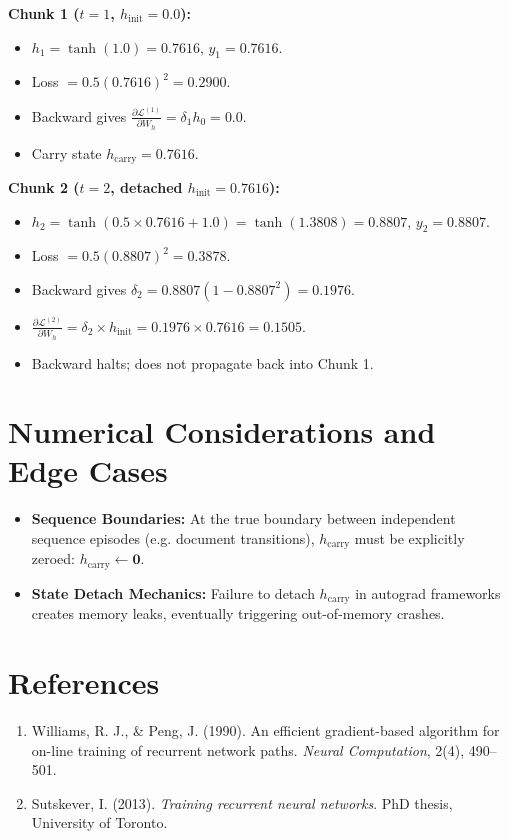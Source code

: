\documentclass[11pt,a4paper]{article}
\theoremstyle{definition}
\begin{document}
\textbf{Chunk 1 ($t=1$, $h_{\text{init}}=0.0$):}
\begin{itemize}
    \item $h_1 = \tanh(1.0) = 0.7616$, $y_1 = 0.7616$.
    \item Loss $= 0.5(0.7616)^2 = 0.2900$.
    \item Backward gives $\frac{\partial \mathcal{L}^{(1)}}{\partial W_h} = \delta_1 h_0 = 0.0$.
    \item Carry state $h_{\text{carry}} = 0.7616$.
\end{itemize}

\textbf{Chunk 2 ($t=2$, detached $h_{\text{init}}=0.7616$):}
\begin{itemize}
    \item $h_2 = \tanh(0.5 \times 0.7616 + 1.0) = \tanh(1.3808) = 0.8807$, $y_2 = 0.8807$.
    \item Loss $= 0.5(0.8807)^2 = 0.3878$.
    \item Backward gives $\delta_2 = 0.8807(1 - 0.8807^2) = 0.1976$.
    \item $\frac{\partial \mathcal{L}^{(2)}}{\partial W_h} = \delta_2 \times h_{\text{init}} = 0.1976 \times 0.7616 = 0.1505$.
    \item Backward halts; does not propagate back into Chunk 1.
\end{itemize}

\section{Numerical Considerations and Edge Cases}

\begin{itemize}
    \item \textbf{Sequence Boundaries:} At the true boundary between independent sequence episodes (e.g. document transitions), $h_{\text{carry}}$ must be explicitly zeroed: $h_{\text{carry}} \gets \mathbf{0}$.
    \item \textbf{State Detach Mechanics:} Failure to detach $h_{\text{carry}}$ in autograd frameworks creates memory leaks, eventually triggering out-of-memory crashes.
\end{itemize}

\section{References}
\begin{enumerate}
    \item Williams, R. J., & Peng, J. (1990). An efficient gradient-based algorithm for on-line training of recurrent network paths. \emph{Neural Computation}, 2(4), 490--501.
    \item Sutskever, I. (2013). \emph{Training recurrent neural networks}. PhD thesis, University of Toronto.
\end{enumerate}
\end{document}
